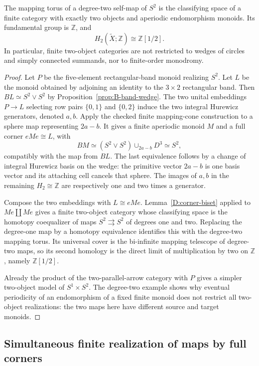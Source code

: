 \begin{proposition}
\label{D:degree-two-torus}
The mapping torus of a degree-two self-map of $S^2$ is the classifying
space of a finite category with exactly two objects and aperiodic
endomorphism monoids. Its fundamental group is $\mathbb Z$, and
\[
 H_2(\widetilde X;\mathbb Z)\cong\mathbb Z[1/2].
\]
In particular, finite two-object categories are not restricted to wedges
of circles and simply connected summands, nor to finite-order monodromy.
\end{proposition}
\begin{proof}
Let $P$ be the five-element rectangular-band monoid realizing $S^2$.
Let $L$ be the monoid obtained by adjoining an identity to the
$3\times2$ rectangular band. Then
$BL\simeq S^2\vee S^2$ by Proposition~\ref{prop:B-band-wedge}.
The two unital embeddings $P\to L$ selecting row pairs $\{0,1\}$ and
$\{0,2\}$ induce the two integral Hurewicz generators, denoted $a,b$.
Apply the checked finite mapping-cone construction to a sphere map
representing $2a-b$. It gives a finite aperiodic monoid $M$ and a full
corner $eMe\cong L$, with
\[
 BM\simeq (S^2\vee S^2)\cup_{2a-b}D^3\simeq S^2,
\]
compatibly with the map from $BL$.
The last equivalence follows by a change of integral Hurewicz basis on
the wedge: the primitive vector $2a-b$ is one basis vector and its
attaching cell cancels that sphere. The images of $a,b$ in the remaining
$H_2\cong\mathbb Z$ are respectively one and two times a generator.

Compose the two embeddings with $L\cong eMe$. Lemma~\ref{D:corner-biset}
applied to $Me\amalg Me$ gives a finite two-object category whose
classifying space is the homotopy coequalizer of maps
$S^2\rightrightarrows S^2$ of degrees one and two. Replacing the
degree-one map by a homotopy equivalence identifies this with the
degree-two mapping torus. Its universal cover is the bi-infinite mapping
telescope of degree-two maps, so its second homology is the direct limit
of multiplication by two on $\mathbb Z$, namely $\mathbb Z[1/2]$.

Already the product of the two-parallel-arrow category with $P$ gives
a simpler two-object model of $S^1\times S^2$. The degree-two example
shows why eventual periodicity of an endomorphism of a fixed finite
monoid does not restrict all two-object realizations: the two maps here
have different source and target monoids.
\end{proof}

\subsection{Simultaneous finite realization of maps by full corners}

